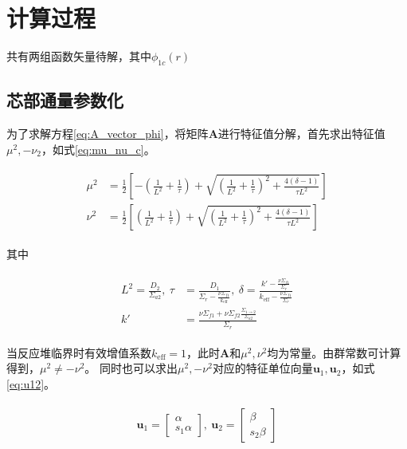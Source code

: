 \section{计算过程}
\label{sec:calculation}

共有两组函数矢量待解，其中$\phi_{1c}(r)$

\subsection{芯部通量参数化}

为了求解方程\ref{eq:A_vector_phi}，将矩阵$\pmb{A}$进行特征值分解，首先求出特征值$\mu^2,-\nu_2$，如式\ref{eq:mu_nu_c}。

\begin{align}
    \label{eq:mu_nu_c}
    \begin{split}
        \mu^2 &= \frac{1}{2}\left[-\left(\frac{1}{L^2}+\frac{1}{\tau}\right)+\sqrt{\left(\frac{1}{L^2}+\frac{1}{\tau}\right)^2+\frac{4(\delta-1)}{\tau L^2}}\right] \\
        \nu^2 &= \frac{1}{2}\left[\left(\frac{1}{L^2}+\frac{1}{\tau}\right)+\sqrt{\left(\frac{1}{L^2}+\frac{1}{\tau}\right)^2+\frac{4(\delta-1)}{\tau L^2}}\right]
    \end{split}
\end{align}

其中

\begin{align}
    \begin{split}
        L^2 = \frac{D_2}{\Sigma_{a2}},\ \tau &= \frac{D_1}{\Sigma_r - \frac{\nu\Sigma_{f1}}{k_\mathrm{eff}}},\ \delta = \frac{k'-\frac{\nu\Sigma_{f1}}{\Sigma_r}}{k_\mathrm{eff}-\frac{\nu\Sigma_{f1}}{\Sigma_r}} \\
        k' &= \frac{\nu\Sigma_{f1}+\nu\Sigma_{f2}\frac{\Sigma_{1\rightarrow 2}}{\Sigma_{a2}}}{\Sigma_r}
    \end{split}
\end{align}

当反应堆临界时有效增值系数$k_\mathrm{eff}=1$，此时$\pmb{A}$和$\mu^2,\nu^2$均为常量。由群常数可计算得到，$\mu^2\neq-\nu^2$。
同时也可以求出$\mu^2,-\nu^2$对应的特征单位向量$\pmb{u}_1,\pmb{u}_2$，如式\ref{eq:u12}。

\begin{align}
    \label{eq:u12}
    \begin{split}
        \pmb{u}_1 = \begin{bmatrix}
            \alpha \\
            s_1\alpha
        \end{bmatrix},\ 
        \pmb{u}_2 = \begin{bmatrix}
            \beta \\
            s_2\beta
        \end{bmatrix}
    \end{split}
\end{align}

